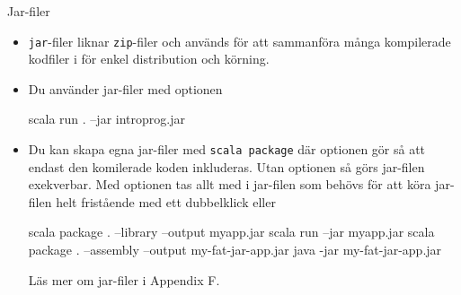 \begin{Slide}{Jar-filer}
\begin{itemize}
\item 
\texttt{jar}-filer liknar \texttt{zip}-filer och används för att sammanföra många kompilerade kodfiler i  för enkel distribution och körning.
\item Du använder jar-filer med optionen 
\begin{REPLsmall}
scala run . --jar introprog.jar
\end{REPLsmall}
\item Du kan skapa egna jar-filer med \texttt{scala package} där optionen  gör så att endast den komilerade koden inkluderas. Utan optionen  så görs jar-filen exekverbar. Med optionen  tas allt med i jar-filen som behövs för att köra jar-filen helt fristående med ett dubbelklick eller 
\begin{REPLsmall}
scala package . --library --output myapp.jar
scala run --jar myapp.jar
scala package . --assembly --output my-fat-jar-app.jar
java -jar my-fat-jar-app.jar
\end{REPLsmall}
Läs mer om jar-filer i Appendix F.
\end{itemize}





\end{Slide}

